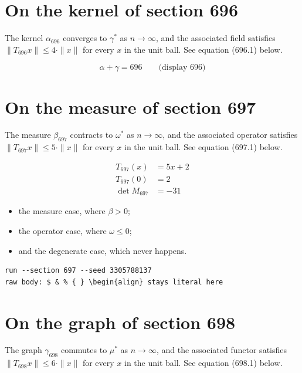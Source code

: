 \documentclass{article}
\begin{document}
\section{On the kernel of section 696}
The kernel $\alpha_{696}$ converges to $\gamma^{*}$ as $n \to \infty$,
and the associated field satisfies $\|T_{696} x\| \leq 4 \cdot \|x\|$
for every $x$ in the unit ball. See equation (696.1) below.

$$
\alpha + \gamma = 696 \qquad \text{(display 696)}
$$

\section{On the measure of section 697}
The measure $\beta_{697}$ contracts to $\omega^{*}$ as $n \to \infty$,
and the associated operator satisfies $\|T_{697} x\| \leq 5 \cdot \|x\|$
for every $x$ in the unit ball. See equation (697.1) below.

\begin{align}
T_{697}(x) &= 5 x + 2 \\
T_{697}(0) &= 2 \\
\det M_{697} &= -31
\end{align}

\begin{itemize}
  \item the measure case, where $\beta > 0$;
  \item the operator case, where $\omega \leq 0$;
  \item and the degenerate case, which never happens.
\end{itemize}

\begin{verbatim}
run --section 697 --seed 3305788137
raw body: $ & % { } \begin{align} stays literal here
\end{verbatim}

\section{On the graph of section 698}
The graph $\gamma_{698}$ commutes to $\mu^{*}$ as $n \to \infty$,
and the associated functor satisfies $\|T_{698} x\| \leq 6 \cdot \|x\|$
for every $x$ in the unit ball. See equation (698.1) below.
\end{document}
